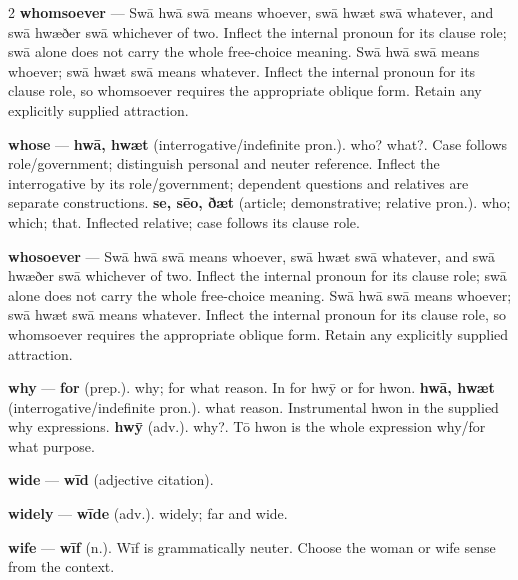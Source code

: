 \begin{multicols}{2}
\textbf{whomsoever} — Swā hwā swā means whoever, swā hwæt swā whatever, and swā hwæðer swā whichever of two. Inflect the internal pronoun for its clause role; swā alone does not carry the whole free-choice meaning. Swā hwā swā means whoever; swā hwæt swā means whatever. Inflect the internal pronoun for its clause role, so whomsoever requires the appropriate oblique form. Retain any explicitly supplied attraction.\par
\textbf{whose} — \textbf{hwā, hwæt} (interrogative/indefinite pron.). who? what?. Case follows role/government; distinguish personal and neuter reference. Inflect the interrogative by its role/government; dependent questions and relatives are separate constructions. \textbf{se, sēo, ðæt} (article; demonstrative; relative pron.). who; which; that. Inflected relative; case follows its clause role.\par
\textbf{whosoever} — Swā hwā swā means whoever, swā hwæt swā whatever, and swā hwæðer swā whichever of two. Inflect the internal pronoun for its clause role; swā alone does not carry the whole free-choice meaning. Swā hwā swā means whoever; swā hwæt swā means whatever. Inflect the internal pronoun for its clause role, so whomsoever requires the appropriate oblique form. Retain any explicitly supplied attraction.\par
\textbf{why} — \textbf{for} (prep.). why; for what reason. In for hwȳ or for hwon. \textbf{hwā, hwæt} (interrogative/indefinite pron.). what reason. Instrumental hwon in the supplied why expressions. \textbf{hwȳ} (adv.). why?. Tō hwon is the whole expression why/for what purpose.\par
\textbf{wide} — \textbf{wīd} (adjective citation).\par
\textbf{widely} — \textbf{wīde} (adv.). widely; far and wide.\par
\textbf{wife} — \textbf{wīf} (n.). Wīf is grammatically neuter. Choose the woman or wife sense from the context.\par

\end{multicols}
